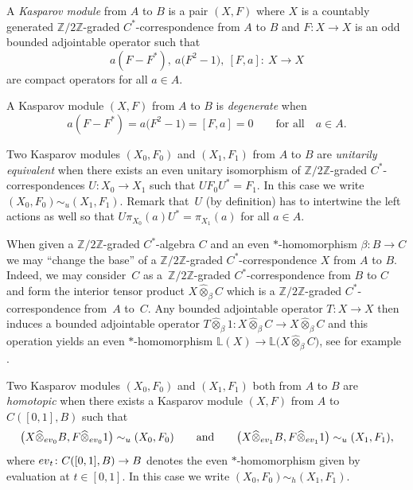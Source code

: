 \documentclass[11pt]{article}
\numberwithin{equation}{section}
\newcommand{\hot}{\widehat \otimes}
\newcommand{\zz}{\mathbb{Z}}
\newcommand{\be}{\beta}
\newcommand{\B}[1]{\mathbb{#1}}
\begin{document}
\begin{dfn}
A \emph{Kasparov module} from $A$ to $B$ is a pair $(X,F)$ where $X$ is a countably generated $\zz/2\zz$-graded $C^*$-correspondence from $A$ to $B$ and $F\colon X \to X$ is an odd bounded adjointable operator such that
\[
a (F - F^*) , \ a \big(F^2 - 1\big) , \ [F,a] \colon \ X \to X
\]
are compact operators for all $a \in A$.

A Kasparov module $(X,F)$ from $A$ to $B$ is \emph{degenerate} when
\[
a (F - F^*) = a \big(F^2 - 1\big) = [F,a] = 0 \qquad \mbox{for all} \quad a \in A .
\]
\end{dfn}

\begin{dfn}Two Kasparov modules $(X_0,F_0)$ and $(X_1,F_1)$ from $A$ to $B$ are \emph{unitarily equivalent} when there exists an even unitary isomorphism of $\zz/2\zz$-graded $C^*$-correspondences $U\colon X_0 \to X_1$ such that $U F_0 U^* = F_1$. In this case we write $(X_0,F_0) \sim_u (X_1,F_1)$. Remark that~$U$ (by definition) has to intertwine the left actions as well so that $U \pi_{X_0}(a) U^* = \pi_{X_1}(a)$ for all $a \in A$.
\end{dfn}

When given a $\zz/2\zz$-graded $C^*$-algebra $C$ and an even $*$-homomorphism $\be\colon B \to C$ we may ``change the base'' of a $\zz/2\zz$-graded $C^*$-correspondence $X$ from $A$ to $B$. Indeed, we may consider~$C$ as a~$\zz/2\zz$-graded $C^*$-correspondence from $B$ to $C$ and form the interior tensor product $X \hot_{\be} C$ which is a $\zz/2\zz$-graded $C^*$-correspondence from~$A$ to~$C$. Any bounded adjointable operator $T\colon X \to X$ then induces a bounded adjointable operator $T \hot_{\be} 1\colon X \hot_{\be} C \to X \hot_{\be} C$ and this operation yields an even $*$-homomorphism $\B L(X) \to \B L\big(X \hot_{\be} C\big)$, see for example \cite[Chapter~4]{Lan:HCM}.

\begin{dfn}Two Kasparov modules $(X_0,F_0)$ and $(X_1,F_1)$ both from $A$ to $B$ are \emph{homotopic} when there exists a Kasparov module $(X,F)$ from $A$ to $C([0,1],B)$ such that
\[
\big(X \hot_{{\rm ev}_0} B,F \hot_{{\rm ev}_0} 1\big) \sim_u (X_0,F_0) \qquad \mbox{and} \qquad \big(X \hot_{{\rm ev}_1} B,F \hot_{{\rm ev}_1} 1\big) \sim_u (X_1,F_1) ,
\]
where ${\rm ev}_t\colon C( [0,1],B) \to B$ denotes the even $*$-homomorphism given by evaluation at $t \in [0,1]$. In this case we write $(X_0,F_0) \sim_h (X_1,F_1)$.
\end{dfn}
\end{document}
